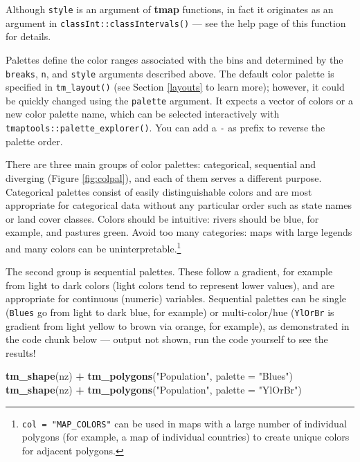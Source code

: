\documentclass[]{krantz}
\newenvironment{Shaded}{\begin{snugshade}}{\end{snugshade}}
\newcommand{\DataTypeTok}[1]{\textcolor[rgb]{0.27,0.27,0.27}{#1}}
\newcommand{\KeywordTok}[1]{\textcolor[rgb]{0.27,0.27,0.27}{\textbf{#1}}}
\newcommand{\NormalTok}[1]{#1}
\newcommand{\OperatorTok}[1]{\textcolor[rgb]{0.43,0.43,0.43}{\textbf{#1}}}
\newcommand{\StringTok}[1]{\textcolor[rgb]{0.5,0.5,0.5}{#1}}
\let\rmarkdownfootnote\footnote%
\def\footnote{\protect\rmarkdownfootnote}
\let\BeginKnitrBlock\begin \let\EndKnitrBlock\end
\begin{document}
\BeginKnitrBlock{rmdnote}
Although \texttt{style} is an argument of \textbf{tmap} functions, in fact it originates as an argument in \texttt{classInt::classIntervals()} --- see the help page of this function for details.
\EndKnitrBlock{rmdnote}

Palettes define the color ranges associated with the bins and determined by the \texttt{breaks}, \texttt{n}, and \texttt{style} arguments described above.
The default color palette is specified in \texttt{tm\_layout()} (see Section \ref{layouts} to learn more); however, it could be quickly changed using the \texttt{palette} argument.
It expects a vector of colors or a new color palette name, which can be selected interactively with \texttt{tmaptools::palette\_explorer()}.
You can add a \texttt{-} as prefix to reverse the palette order.

There are three main groups of color palettes: categorical, sequential and diverging (Figure \ref{fig:colpal}), and each of them serves a different purpose.
Categorical palettes consist of easily distinguishable colors and are most appropriate for categorical data without any particular order such as state names or land cover classes.
Colors should be intuitive: rivers should be blue, for example, and pastures green.
Avoid too many categories: maps with large legends and many colors can be uninterpretable.\footnote{\texttt{col\ =\ "MAP\_COLORS"} can be used in maps with a large number of individual polygons (for example, a map of individual countries) to create unique colors for adjacent polygons.}

The second group is sequential palettes.
These follow a gradient, for example from light to dark colors (light colors tend to represent lower values), and are appropriate for continuous (numeric) variables.
Sequential palettes can be single (\texttt{Blues} go from light to dark blue, for example) or multi-color/hue (\texttt{YlOrBr} is gradient from light yellow to brown via orange, for example), as demonstrated in the code chunk below --- output not shown, run the code yourself to see the results!

\begin{Shaded}
\begin{Highlighting}[]
\KeywordTok{tm_shape}\NormalTok{(nz) }\OperatorTok{+}\StringTok{ }\KeywordTok{tm_polygons}\NormalTok{(}\StringTok{"Population"}\NormalTok{, }\DataTypeTok{palette =} \StringTok{"Blues"}\NormalTok{)}
\KeywordTok{tm_shape}\NormalTok{(nz) }\OperatorTok{+}\StringTok{ }\KeywordTok{tm_polygons}\NormalTok{(}\StringTok{"Population"}\NormalTok{, }\DataTypeTok{palette =} \StringTok{"YlOrBr"}\NormalTok{)}
\end{Highlighting}
\end{Shaded}
\end{document}

